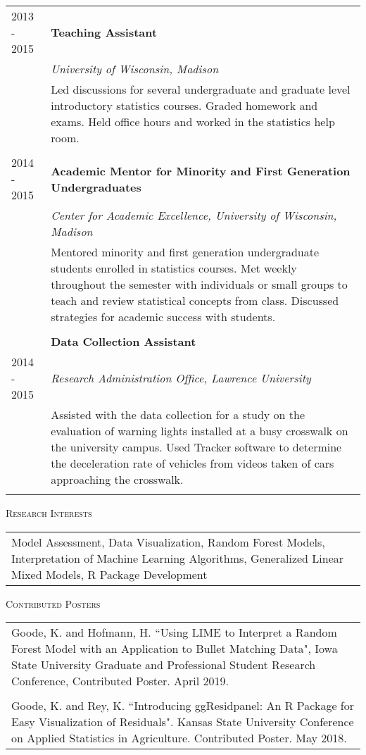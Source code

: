 \documentclass[11pt, oneside]{article}
\begin{document}
\begin{longtable}{p{2.5cm}p{14cm}}
\\
\hfill{2013 - 2015} & \textbf{Teaching Assistant}\\
& \emph{University of Wisconsin, Madison}\\
& Led discussions for several undergraduate and graduate level introductory statistics courses. Graded homework and exams. Held office hours and worked in the statistics help room.\\
\\
\hfill{2014 - 2015} & \textbf{Academic Mentor for Minority and First Generation Undergraduates}\\
& \emph{Center for Academic Excellence, University of Wisconsin, Madison}\\
& Mentored minority and first generation undergraduate students enrolled in statistics courses. Met weekly throughout the semester with individuals or small groups to teach and review statistical concepts from class. Discussed strategies for academic success with students.\\
\\
& \textbf{Data Collection Assistant}\\
\hfill{2014 - 2015} & \emph{Research Administration Office, Lawrence University}\\
& Assisted with the data collection for a study on the evaluation of warning lights installed at a busy crosswalk on the university campus. Used Tracker software to determine the deceleration rate of vehicles from videos taken of cars approaching the crosswalk.\\
\\
\end{longtable}

\noindent \textsc{Research Interests} \hrulefill
\begin{longtable}{p{16.5cm}}
Model Assessment, Data Visualization, Random Forest Models, Interpretation of Machine Learning Algorithms, Generalized Linear Mixed Models, R Package Development
\end{longtable}

\noindent \textsc{Contributed Posters} \hrulefill
\begin{longtable}{p{16.5cm}}
Goode, K. and Hofmann, H. ``Using LIME to Interpret a Random Forest Model with an Application to Bullet Matching Data", Iowa State University Graduate and Professional Student Research Conference, Contributed Poster. April 2019.\\
\\ 
Goode, K. and Rey, K. ``Introducing ggResidpanel: An R Package for Easy Visualization of Residuals". Kansas State University Conference on Applied Statistics in Agriculture. Contributed Poster. May 2018.
\end{longtable}
\end{document}
